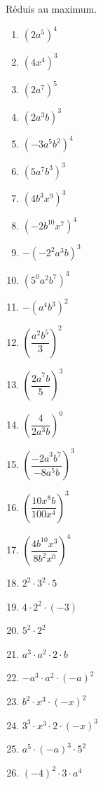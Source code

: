 \begin{exercise}
  Réduis au maximum.
  \begin{enumerate}[cols=3, itemsep=1em]
    
      \item \(\left( 2a^{5} \right)^{4} \)
      \item \(\left( 4x^{4} \right)^{3} \)
      \item \(\left( 2a^{7} \right)^{5} \)
      \item \(\left( 2a^{3}b \right)^{3} \)
      \item \(\left( - 3a^{5}b^{2} \right)^{4} \)
      \item \(\left( 5a^{7}b^{3} \right)^{3} \)
      \item \(\left( 4b^{3}x^{9} \right)^{3} \)
      \item \(\left( - 2b^{10}x^{7} \right)^{4} \)
      \item \(- \left( - 2^{2}a^{3}b \right)^{3} \)
      \item \(\left( 5^{0}a^{2}b^{7} \right)^{3} \)
      \item \(- \left( a^{4}b^{3} \right)^{2} \)
      \item \(\left( \dfrac{a^{2}b^{5}}{3} \right)^{2} \)
      \item \(\left( \dfrac{{2a}^{7}b}{5} \right)^{3} \)
      \item \(\left( \dfrac{4}{2a^{3}b} \right)^{0} \)
      \item \(\left( \dfrac{{- 2a}^{3}b^{7}}{- 8a^{5}b} \right)^{3} \)
      \item \(\left( \dfrac{{10x}^{8}b}{100x^{4}} \right)^{3} \)
      \item \(\left( \dfrac{{4b}^{10}x^{3}}{8b^{2}x^{0}} \right)^{4} \)
      \item \(2^{2} \cdot 3^{2} \cdot 5 \)
      \item \(4 \cdot 2^{2} \cdot ( - 3) \)
      \item \(5^{2} \cdot 2^{2} \)
      \item \(a^{3} \cdot a^{2} \cdot 2 \cdot b \)
      \item \(- a^{3} \cdot a^{2} \cdot ( - a)^{2} \)
      \item \(b^{2} \cdot x^{3} \cdot ( - x)^{2} \)
      \item \(3^{3} \cdot x^{3} \cdot 2 \cdot ( - x)^{3} \)
      \item \(a^{5} \cdot ( - a)^{3} \cdot 5^{2} \)
      \item \(( - 4)^{2} \cdot 3 \cdot a^{4} \)
  \end{enumerate}
\end{exercise}




